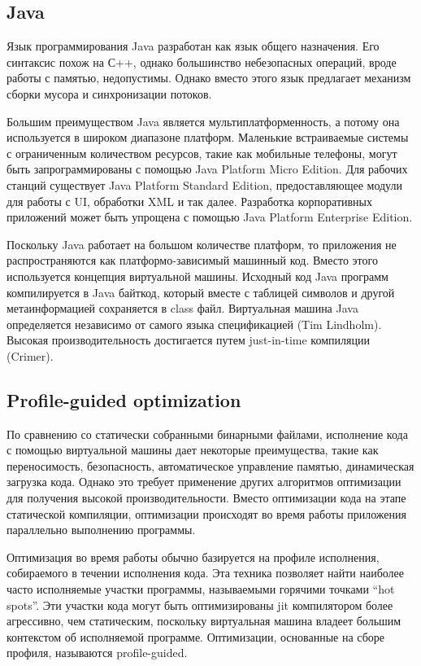 \subsection{Java} \label{Java}
Язык программирования Java разработан как язык общего назначения. Его синтаксис похож на С++, однако большинство небезопасных операций, вроде работы с памятью, недопустимы. Однако вместо этого язык предлагает механизм сборки мусора и синхронизации потоков.
\par
Большим преимуществом Java является мультиплатформенность, а потому она используется в широком диапазоне платформ. Маленькие встраиваемые системы с ограниченным количеством ресурсов, такие как мобильные телефоны, могут быть запрограммированы с помощью Java Platform Micro Edition. Для рабочих станций существует Java Platform Standard Edition, предоставляющее модули для работы с UI, обработки XML и так далее. Разработка корпоративных приложений может быть упрощена с помощью Java Platform Enterprise Edition.
\par
Поскольку Java работает на большом количестве платформ, то приложения не распространяются как платформо-зависимый машинный код. Вместо этого используется концепция виртуальной машины. Исходный код Java программ компилируется в Java байткод, который вместе с таблицей символов и другой метаинформацией сохраняется в class файл.  Виртуальная машина Java определяется независимо от самого языка спецификацией (Tim Lindholm). Высокая производительность достигается путем just-in-time компиляции (Crimer). 

\subsection{Profile-guided optimization}
По сравнению со статически собранными бинарными файлами, исполнение кода с помощью виртуальной машины дает некоторые преимущества, такие как переносимость, безопасность, автоматическое управление памятью, динамическая загрузка кода. Однако это требует применение других алгоритмов оптимизации для получения высокой производительности. Вместо оптимизации кода на этапе статической компиляции, оптимизации происходят во время работы приложения параллельно выполнению программы.
\par
Оптимизация во время работы обычно базируется на профиле исполнения, собираемого в течении исполнения кода. Эта техника позволяет найти наиболее часто исполняемые участки программы, называемыми горячими точками “hot spots”. Эти участки кода могут быть оптимизированы jit компилятором более агрессивно, чем статическим, поскольку виртуальная машина владеет большим контекстом об исполняемой программе. Оптимизации, основанные на сборе профиля, называются profile-guided.

